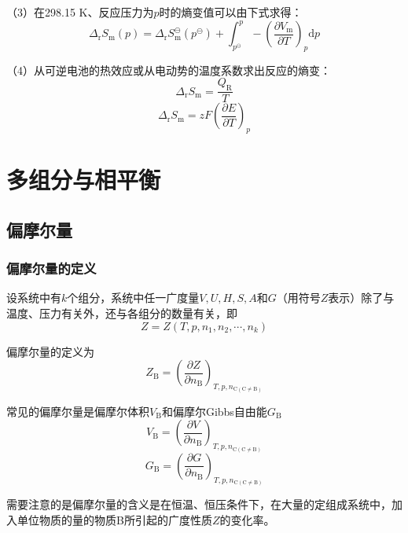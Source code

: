 \documentclass[lang=cn,newtx,10pt,scheme=chinese]{elegantbook}
\begin{document}
（3）在298.15 K、反应压力为$p$时的熵变值可以由下式求得：
\begin{equation}
	\Delta _\mathrm{r}S_\mathrm{m}(p)= \Delta _\mathrm{r}S^\ominus _\mathrm{m}(p^\ominus )
	+\int_{p^\ominus }^{p}-\left ( \frac{\partial V_\mathrm{m} }{\partial T}  \right )_p\mathrm{d}p 
\end{equation}

（4）从可逆电池的热效应或从电动势的温度系数求出反应的熵变：
\begin{equation}
	\Delta _\mathrm{r} S_\mathrm{m}=\frac{Q_\mathrm{R} }{T}  
\end{equation}
\begin{equation}
	\Delta _\mathrm{r} S_\mathrm{m}=zF\left ( \frac{\partial E}{\partial T}  \right )_p
\end{equation}

\chapter{多组分与相平衡}
\section{偏摩尔量}
\subsection{偏摩尔量的定义}
设系统中有$k$个组分，系统中任一广度量$V,U,H,S,A$和$G$（用符号$Z$表示）除了与温度、压力有关外，还与各组分的数量有关，即
\begin{equation}
	Z=Z(T,p,n_1,n_2,\cdots,n_k)
\end{equation}

偏摩尔量的定义为
\begin{equation}
	Z_\mathrm{B} = \left(\frac{\partial Z}{\partial n_\mathrm{B}}\right)_{T,p,n_{\mathrm{C}(\mathrm{C \ne B})}} 
\end{equation}

常见的偏摩尔量是偏摩尔体积$V_\mathrm{B}$和偏摩尔Gibbs自由能$G_\mathrm{B}$
\begin{equation}
	V_\mathrm{B}=\left ( \frac{\partial V}{\partial n_\mathrm{B} }  \right )_{T,p,n_{\mathrm{C}(\mathrm{C \ne B})}}   
\end{equation}
\begin{equation}
	G_\mathrm{B}=\left ( \frac{\partial G}{\partial n_\mathrm{B} }  \right )_{T,p,n_{\mathrm{C}(\mathrm{C \ne B})}}   
\end{equation}

需要注意的是偏摩尔量的含义是在恒温、恒压条件下，在大量的定组成系统中，加入单位物质的量的物质B所引起的广度性质$Z$的变化率。
\end{document}
